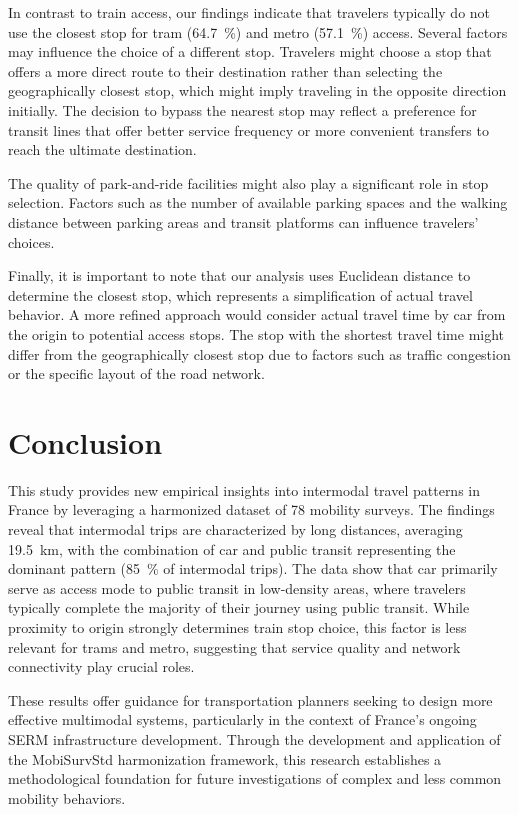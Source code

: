 \documentclass[3p,times,procedia]{elsarticle}
\begin{document}
In contrast to train access, our findings indicate that travelers typically do not use the closest stop for tram (\SI{64.7}{\%}) and metro (\SI{57.1}{\%}) access.
Several factors may influence the choice of a different stop.
Travelers might choose a stop that offers a more direct route to their destination rather than selecting the geographically closest stop, which might imply traveling in the opposite direction initially.
The decision to bypass the nearest stop may reflect a preference for transit lines that offer better service frequency or more convenient transfers to reach the ultimate destination.

The quality of park-and-ride facilities might also play a significant role in stop selection.
Factors such as the number of available parking spaces and the walking distance between parking areas and transit platforms can influence travelers' choices.

Finally, it is important to note that our analysis uses Euclidean distance to determine the closest stop, which represents a simplification of actual travel behavior.
A more refined approach would consider actual travel time by car from the origin to potential access stops.
The stop with the shortest travel time might differ from the geographically closest stop due to factors such as traffic congestion or the specific layout of the road network.

\section{Conclusion}

This study provides new empirical insights into intermodal travel patterns in France by leveraging a harmonized dataset of 78 mobility surveys.
The findings reveal that intermodal trips are characterized by long distances, averaging \SI{19.5}{\kilo\meter}, with the combination of car and public transit representing the dominant pattern (\SI{85}{\%} of intermodal trips).
The data show that car primarily serve as access mode to public transit in low-density areas, where travelers typically complete the majority of their journey using public transit.
While proximity to origin strongly determines train stop choice, this factor is less relevant for trams and metro, suggesting that service quality and network connectivity play crucial roles.

These results offer guidance for transportation planners seeking to design more effective multimodal systems, particularly in the context of France's ongoing SERM infrastructure development.
Through the development and application of the MobiSurvStd harmonization framework, this research establishes a methodological foundation for future investigations of complex and less common mobility behaviors.
\end{document}
